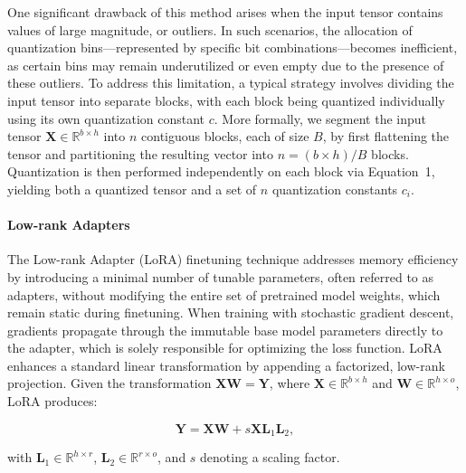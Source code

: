 One significant drawback of this method arises when the input tensor contains values of large magnitude, or outliers. In such scenarios, the allocation of quantization bins—represented by specific bit combinations—becomes inefficient, as certain bins may remain underutilized or even empty due to the presence of these outliers. To address this limitation, a typical strategy involves dividing the input tensor into separate blocks, with each block being quantized individually using its own quantization constant $c$. More formally, we segment the input tensor $\mathbf{X}\in \mathbb{R}^{b\times h}$ into $n$ contiguous blocks, each of size $B$, by first flattening the tensor and partitioning the resulting vector into ${n = ({b\times h})/{B}}$ blocks. Quantization is then performed independently on each block via Equation~1, yielding both a quantized tensor and a set of $n$ quantization constants $c_i$.

\paragraph{Low-rank Adapters} The Low-rank Adapter (LoRA) finetuning technique \citep{hu2021lora} addresses memory efficiency by introducing a minimal number of tunable parameters, often referred to as adapters, without modifying the entire set of pretrained model weights, which remain static during finetuning. When training with stochastic gradient descent, gradients propagate through the immutable base model parameters directly to the adapter, which is solely responsible for optimizing the loss function. LoRA enhances a standard linear transformation by appending a factorized, low-rank projection. Given the transformation ${\mathbf{X} \mathbf{W} = \mathbf{Y}}$, where $\mathbf{X}\in  \mathbb{R}^{b\times h}$ and $\mathbf{W}\in  \mathbb{R}^{h\times o}$, LoRA produces:

\begin{equation}
    \mathbf{Y} = \mathbf{X}\mathbf{W} + s\mathbf{X}\mathbf{L}_1\mathbf{L}_2,
\end{equation}

with $\mathbf{L}_1\in  \mathbb{R}^{h\times r}$, $\mathbf{L}_2\in  \mathbb{R}^{r\times o}$, and $s$ denoting a scaling factor.

